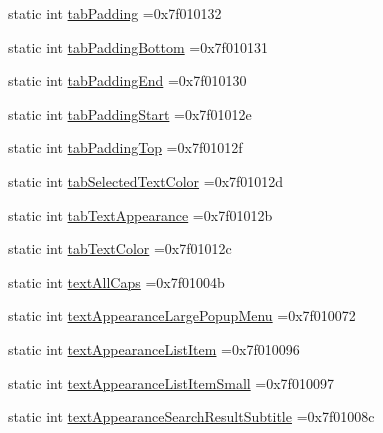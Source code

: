 \begin{DoxyCompactItemize}
\item 
static int \hyperlink{classandroid_1_1support_1_1v7_1_1cardview_1_1R_1_1attr_a212c434939a73d19c290434e3cb6c8e5}{tab\+Padding} =0x7f010132
\item 
static int \hyperlink{classandroid_1_1support_1_1v7_1_1cardview_1_1R_1_1attr_a7133b9a847747e6ce407a36b0d131318}{tab\+Padding\+Bottom} =0x7f010131
\item 
static int \hyperlink{classandroid_1_1support_1_1v7_1_1cardview_1_1R_1_1attr_a0c091ae5857b1f85a1f9bc1be7e4e8e6}{tab\+Padding\+End} =0x7f010130
\item 
static int \hyperlink{classandroid_1_1support_1_1v7_1_1cardview_1_1R_1_1attr_a3421bca05bbfb8a54877854aa30829c0}{tab\+Padding\+Start} =0x7f01012e
\item 
static int \hyperlink{classandroid_1_1support_1_1v7_1_1cardview_1_1R_1_1attr_affa888541a738a70bd00ff1842fcdf48}{tab\+Padding\+Top} =0x7f01012f
\item 
static int \hyperlink{classandroid_1_1support_1_1v7_1_1cardview_1_1R_1_1attr_a3ffecd1757b4e0a371094c0edb7234e3}{tab\+Selected\+Text\+Color} =0x7f01012d
\item 
static int \hyperlink{classandroid_1_1support_1_1v7_1_1cardview_1_1R_1_1attr_a991714806007fb1bbebad5f2c6fc6155}{tab\+Text\+Appearance} =0x7f01012b
\item 
static int \hyperlink{classandroid_1_1support_1_1v7_1_1cardview_1_1R_1_1attr_aef38b3fa4a5c5d4184041e5dec1e70a7}{tab\+Text\+Color} =0x7f01012c
\item 
static int \hyperlink{classandroid_1_1support_1_1v7_1_1cardview_1_1R_1_1attr_a319eca13d313e050d22fac372aa21425}{text\+All\+Caps} =0x7f01004b
\item 
static int \hyperlink{classandroid_1_1support_1_1v7_1_1cardview_1_1R_1_1attr_ae017936149061e07ad19fbf80ad512c0}{text\+Appearance\+Large\+Popup\+Menu} =0x7f010072
\item 
static int \hyperlink{classandroid_1_1support_1_1v7_1_1cardview_1_1R_1_1attr_a504a1e2232cabe69718c28f8f8e1f022}{text\+Appearance\+List\+Item} =0x7f010096
\item 
static int \hyperlink{classandroid_1_1support_1_1v7_1_1cardview_1_1R_1_1attr_a597866d38e854d681b09252165dda349}{text\+Appearance\+List\+Item\+Small} =0x7f010097
\item 
static int \hyperlink{classandroid_1_1support_1_1v7_1_1cardview_1_1R_1_1attr_ab3920ecf71a4a5679ad0ce89fc417104}{text\+Appearance\+Search\+Result\+Subtitle} =0x7f01008c
\item 

\end{DoxyCompactItemize}
